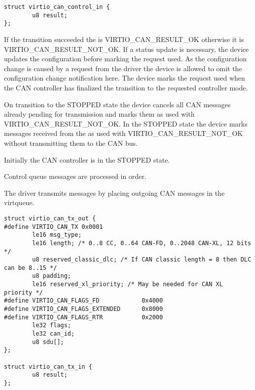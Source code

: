 \begin{lstlisting}
struct virtio_can_control_in {
        u8 result;
};
\end{lstlisting}

If the transition succeeded the  is VIRTIO_CAN_RESULT_OK
otherwise it is VIRTIO_CAN_RESULT_NOT_OK. If a status update is
necessary, the device updates the configuration  before
marking the request used. As the configuration  change is
caused by a request from the driver the device is allowed to omit the
configuration change notification here. The device marks the request
used when the CAN controller has finalized the transition to the
requested controller mode.

On transition to the STOPPED state the device cancels all CAN messages
already pending for transmission and marks them as used with
 VIRTIO_CAN_RESULT_NOT_OK. In the STOPPED state the
device marks messages received from the
 as used with  VIRTIO_CAN_RESULT_NOT_OK without
transmitting them to the CAN bus.

Initially the CAN controller is in the STOPPED state.

Control queue messages are processed in order.


The driver transmits messages by placing outgoing CAN messages in the
 virtqueue.

\label{struct virtio_can_tx_out}
\begin{lstlisting}
struct virtio_can_tx_out {
#define VIRTIO_CAN_TX 0x0001
        le16 msg_type;
        le16 length; /* 0..8 CC, 0..64 CAN-FD, 0..2048 CAN-XL, 12 bits */
        u8 reserved_classic_dlc; /* If CAN classic length = 8 then DLC can be 8..15 */
        u8 padding;
        le16 reserved_xl_priority; /* May be needed for CAN XL priority */
#define VIRTIO_CAN_FLAGS_FD            0x4000
#define VIRTIO_CAN_FLAGS_EXTENDED      0x8000
#define VIRTIO_CAN_FLAGS_RTR           0x2000
        le32 flags;
        le32 can_id;
        u8 sdu[];
};

struct virtio_can_tx_in {
        u8 result;
};
\end{lstlisting}

